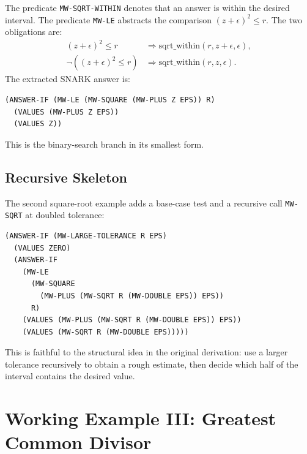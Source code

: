 \documentclass[runningheads]{llncs}
\begin{document}
The predicate \texttt{MW-SQRT-WITHIN} denotes that an answer is within the
desired interval.  The predicate \texttt{MW-LE} abstracts the comparison
\((z+\epsilon)^2 \leq r\).  The two obligations are:
\begin{align*}
  (z+\epsilon)^2 \leq r
    &\Rightarrow \mathrm{sqrt\_within}(r,z+\epsilon,\epsilon),\\
  \neg((z+\epsilon)^2 \leq r)
    &\Rightarrow \mathrm{sqrt\_within}(r,z,\epsilon).
\end{align*}
The extracted SNARK answer is:
\begin{lstlisting}
(ANSWER-IF (MW-LE (MW-SQUARE (MW-PLUS Z EPS)) R)
  (VALUES (MW-PLUS Z EPS))
  (VALUES Z))
\end{lstlisting}
This is the binary-search branch in its smallest form.

\subsection{Recursive Skeleton}

The second square-root example adds a base-case test and a recursive call
\texttt{MW-SQRT} at doubled
tolerance:
\begin{lstlisting}
(ANSWER-IF (MW-LARGE-TOLERANCE R EPS)
  (VALUES ZERO)
  (ANSWER-IF
    (MW-LE
      (MW-SQUARE
        (MW-PLUS (MW-SQRT R (MW-DOUBLE EPS)) EPS))
      R)
    (VALUES (MW-PLUS (MW-SQRT R (MW-DOUBLE EPS)) EPS))
    (VALUES (MW-SQRT R (MW-DOUBLE EPS)))))
\end{lstlisting}
This is faithful to the structural idea in the original derivation: use a
larger tolerance recursively to obtain a rough estimate, then decide which half
of the interval contains the desired value.

\section{Working Example III: Greatest Common Divisor}
\end{document}

